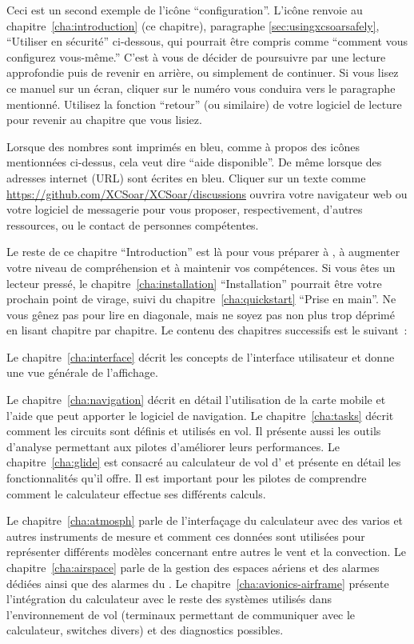  Ceci est un second exemple de l'icône ``configuration''. L'icône renvoie
au chapitre~\ref{cha:introduction} (ce chapitre), paragraphe 
\ref{sec:usingxcsoarsafely}, ``Utiliser \xc{} en sécurité'' ci-dessous, qui pourrait être 
compris comme ``comment vous configurez vous-même.'' C'est à vous de décider de poursuivre
par une lecture approfondie puis de revenir en arrière, ou simplement de continuer. Si vous lisez ce manuel
sur un écran, cliquer sur le numéro vous conduira vers le paragraphe
mentionné. Utilisez la fonction ``retour'' (ou similaire) de votre
logiciel de lecture pour revenir au chapitre que vous lisiez.

Lorsque des nombres sont imprimés en bleu, comme à propos des icônes mentionnées ci-dessus, cela veut dire ``aide disponible''.
De même lorsque des adresses internet (URL) sont écrites en bleu. 
Cliquer sur un texte comme \url{https://github.com/XCSoar/XCSoar/discussions} ouvrira votre navigateur web
ou votre logiciel de messagerie pour vous proposer, respectivement, d'autres ressources, ou le contact
de personnes compétentes.

Le reste de ce chapitre ``Introduction'' est là pour vous préparer à \xc,
à augmenter votre niveau de compréhension et à maintenir vos compétences.
Si vous êtes un lecteur pressé, le chapitre~\ref{cha:installation} ``Installation'' pourrait être votre prochain point de virage, suivi du chapitre~\ref{cha:quickstart} ``Prise en main''. Ne vous gênez pas pour lire
en diagonale, mais ne soyez pas non plus trop déprimé en lisant chapitre par chapitre. Le contenu des chapitres successifs est le suivant~:

Le chapitre~\ref{cha:interface} décrit les concepts de l'interface utilisateur et donne une vue générale de l'affichage.

Le chapitre~\ref{cha:navigation} décrit en détail l'utilisation de la carte mobile et l'aide que peut apporter le logiciel de navigation. Le chapitre~\ref{cha:tasks} décrit comment les circuits sont définis et utilisés en vol. Il présente aussi les outils d'analyse permettant aux pilotes d'améliorer leurs performances. Le chapitre~\ref{cha:glide} est consacré au calculateur de vol d'\xc{} et présente en détail les fonctionnalités qu'il offre. Il est important pour les pilotes de comprendre comment le calculateur effectue ses différents calculs.

Le chapitre~\ref{cha:atmosph} parle de l'interfaçage du calculateur avec des varios et autres instruments de mesure et comment ces données sont utilisées pour représenter différents modèles concernant entre autres le vent et la convection. Le chapitre~\ref{cha:airspace} parle de la gestion des espaces aériens et des alarmes dédiées ainsi que des alarmes du \fl. Le chapitre~\ref{cha:avionics-airframe} présente l'intégration du calculateur avec le reste des systèmes utilisés dans l'environnement de vol (terminaux permettant de communiquer avec le calculateur, switches divers) et des diagnostics possibles.

